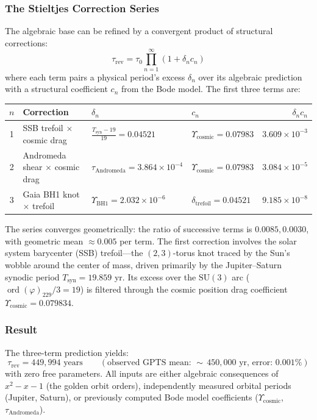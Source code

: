 \subsubsection{The Stieltjes Correction Series}

The algebraic base can be refined by a convergent product of structural corrections:
\begin{equation}\label{eq:stieltjes}
    \tau_{\mathrm{rev}} = \tau_0 \prod_{n=1}^{\infty} (1 + \delta_n c_n)
\end{equation}
where each term pairs a physical period's excess $\delta_n$ over its algebraic prediction with a structural coefficient $c_n$ from the Bode model. The first three terms are:

\begin{center}
\renewcommand{\arraystretch}{1.3}
\begin{tabular}{clllr}
\hline
$n$ & Correction & $\delta_n$ & $c_n$ & $\delta_n c_n$ \\
\hline
1 & SSB trefoil $\times$ cosmic drag & $\frac{T_{\mathrm{syn}} - 19}{19} = 0.04521$ & $\Upsilon_{\mathrm{cosmic}} = 0.07983$ & $3.609 \times 10^{-3}$ \\
2 & Andromeda shear $\times$ cosmic drag & $\tau_{\mathrm{Andromeda}} = 3.864 \times 10^{-4}$ & $\Upsilon_{\mathrm{cosmic}} = 0.07983$ & $3.084 \times 10^{-5}$ \\
3 & Gaia BH1 knot $\times$ trefoil & $\Upsilon_{\mathrm{BH1}} = 2.032 \times 10^{-6}$ & $\delta_{\mathrm{trefoil}} = 0.04521$ & $9.185 \times 10^{-8}$ \\
\hline
\end{tabular}
\end{center}

The series converges geometrically: the ratio of successive terms is $0.0085, 0.0030$, with geometric mean $\approx 0.005$ per term. The first correction involves the solar system barycenter (SSB) trefoil---the $(2,3)$-torus knot traced by the Sun's wobble around the center of mass, driven primarily by the Jupiter--Saturn synodic period $T_{\mathrm{syn}} = 19.859$ yr. Its excess over the $\mathrm{SU}(3)$ arc ($\operatorname{ord}(\varphi)_{229}/3 = 19$) is filtered through the cosmic position drag coefficient $\Upsilon_{\mathrm{cosmic}} = 0.079834$.

\subsubsection{Result}

The three-term prediction yields:
\begin{equation}\label{eq:reversal_result}
    \boxed{\tau_{\mathrm{rev}} = 449{,}994 \text{ years} \qquad (\text{observed GPTS mean: } {\sim}\,450{,}000 \text{ yr, error: } 0.001\%)}
\end{equation}
with zero free parameters. All inputs are either algebraic consequences of $x^2 - x - 1$ (the golden orbit orders), independently measured orbital periods (Jupiter, Saturn), or previously computed Bode model coefficients ($\Upsilon_{\mathrm{cosmic}}$, $\tau_{\mathrm{Andromeda}}$).

